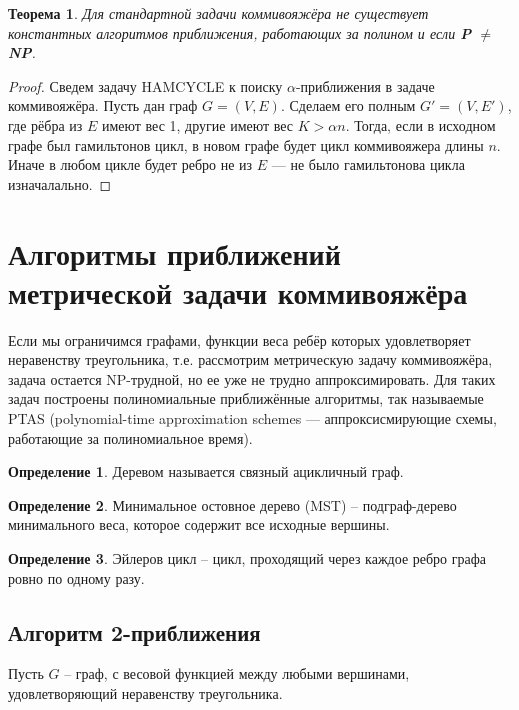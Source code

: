 \documentclass[a4paper,12pt]{article}
\theoremstyle{plain}
\newtheorem{theorem}{Теорема}[section]
\theoremstyle{definition}
\newtheorem{definition}{Определение}[section]
\theoremstyle{remark}
\begin{document}
\begin{theorem}
    Для стандартной задачи коммивояжёра не существует константных алгоритмов приближения, работающих за полином и если \textbf{P} $\neq$ \textbf{NP}.
\end{theorem}

\begin{proof}
    Сведем задачу \textsf{HAMCYCLE} к поиску $\alpha$-приближения в задаче коммивояжёра. Пусть дан граф $G = \left(V, E\right)$. Сделаем его полным $G' = \left(V, E'\right)$, где рёбра из $E$ имеют вес 1, другие имеют вес $K > \alpha n$. Тогда, если в исходном графе был гамильтонов цикл, в новом графе будет цикл коммивояжера длины $n$. Иначе в любом цикле будет ребро не из $E$ --- не было гамильтонова цикла изначалально.
\end{proof}

\section{Алгоритмы приближений метрической задачи коммивояжёра}
Если мы ограничимся графами, функции веса ребёр которых удовлетворяет неравенству треугольника, т.е. рассмотрим метрическую задачу коммивояжёра, задача остается NP-трудной, но ее уже не трудно 
аппроксимировать. Для таких задач построены полиномиальные приближённые алгоритмы, так называемые \textsf{PTAS} (polynomial-time approximation schemes — аппроксисмирующие схемы, работающие за полиномиальное время). 

\begin{definition}
    Деревом называется связный ацикличный граф.
\end{definition}

\begin{definition}
    Минимальное остовное дерево (\textsf{MST}) -- подграф-дерево минимального веса, которое содержит все исходные вершины.
\end{definition}

\begin{definition}
    Эйлеров цикл -- цикл, проходящий через каждое ребро графа ровно по одному разу.
\end{definition}

\subsection{Алгоритм 2-приближения}

Пусть $G$ -- граф, с весовой функцией между любыми вершинами, удовлетворяющий неравенству треугольника.
\end{document}
